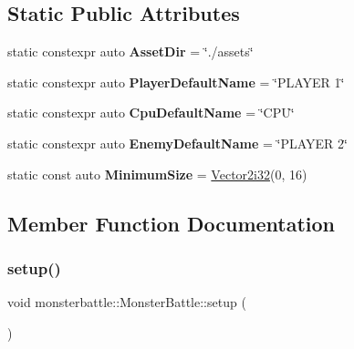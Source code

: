 \subsection*{Static Public Attributes}
\begin{DoxyCompactItemize}
\item 
\mbox{\label{classmonsterbattle_1_1MonsterBattle_a945f251377e27e3ea6aaacf43655c3a1}} 
static constexpr auto {\bfseries Asset\+Dir} = \char`\"{}./assets\char`\"{}
\item 
\mbox{\label{classmonsterbattle_1_1MonsterBattle_a26c9007075c12d61dd863f09ce151eb9}} 
static constexpr auto {\bfseries Player\+Default\+Name} = \char`\"{}P\+L\+A\+Y\+ER 1\char`\"{}
\item 
\mbox{\label{classmonsterbattle_1_1MonsterBattle_ae090da2f51f633491262d79ea092a930}} 
static constexpr auto {\bfseries Cpu\+Default\+Name} = \char`\"{}C\+PU\char`\"{}
\item 
\mbox{\label{classmonsterbattle_1_1MonsterBattle_aeeabad2a999656c75373a16a40ab9a86}} 
static constexpr auto {\bfseries Enemy\+Default\+Name} = \char`\"{}P\+L\+A\+Y\+ER 2\char`\"{}
\item 
\mbox{\label{classmonsterbattle_1_1MonsterBattle_a3268782c3c75b6d2b65f87cce3bef4c8}} 
static const auto {\bfseries Minimum\+Size} = \hyperlink{structmonsterbattle_1_1Vector}{Vector2i32}(0, 16)
\end{DoxyCompactItemize}


\subsection{Member Function Documentation}
\mbox{\label{classmonsterbattle_1_1MonsterBattle_ac06a07fc5c81cab7c03758fdf87b03ea}} 
\subsubsection{\texorpdfstring{setup()}{setup()}}
{\footnotesize\ttfamily void monsterbattle\+::\+Monster\+Battle\+::setup (\begin{DoxyParamCaption}{ }\end{DoxyParamCaption})}



